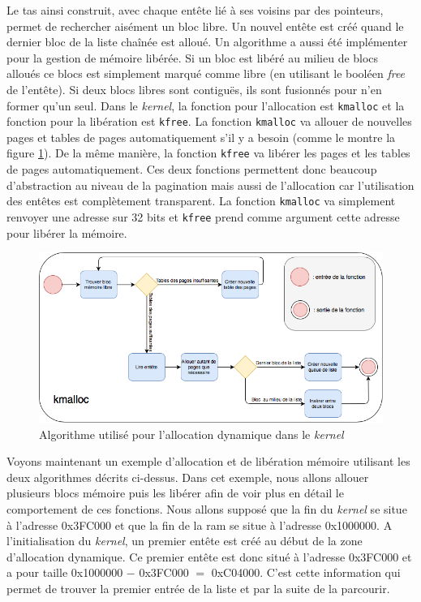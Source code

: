 Le tas ainsi construit, avec chaque entête lié à ses voisins par des pointeurs,
permet de rechercher aisément un bloc libre. Un nouvel entête est créé quand le
dernier bloc de la liste chaînée est alloué. Un algorithme a aussi été implémenter
pour la gestion de mémoire libérée. Si un bloc est libéré au milieu de blocs
alloués ce blocs est simplement marqué comme libre (en utilisant le booléen \textit{free}
de l'entête). Si deux blocs libres sont contiguës, ils sont fusionnés pour n'en
former qu'un seul. Dans le \textit{kernel}, la fonction pour l'allocation est
\texttt{kmalloc} et la fonction pour la libération est \texttt{kfree}.
La fonction \texttt{kmalloc} va allouer de nouvelles pages et tables
de pages automatiquement s'il y a besoin (comme le montre la figure \ref{kmalloc}).
De la même manière, la fonction \texttt{kfree} va libérer les pages et
les tables de pages automatiquement. Ces deux fonctions permettent donc beaucoup
d'abstraction au niveau de la pagination mais aussi de l'allocation car l'utilisation
des entêtes est complètement transparent. La fonction \texttt{kmalloc}
va simplement renvoyer une adresse sur 32 bits et \texttt{kfree} prend
comme argument cette adresse pour libérer la mémoire.

\begin{figure}[!h]
  \centering
  \includegraphics[scale=0.6]{images/kmalloc.png}
  \caption{Algorithme utilisé pour l'allocation dynamique dans le \textit{kernel}}
  \label{kmalloc}
\end{figure}

Voyons maintenant un exemple d'allocation et de libération mémoire utilisant les
deux algorithmes décrits ci-dessus. Dans cet exemple, nous allons allouer plusieurs
blocs mémoire puis les libérer afin de voir plus en détail le comportement
de ces fonctions. Nous allons supposé que la fin du \textit{kernel} se situe
à l'adresse 0x3FC000 et que la fin de la \acrshort{ram} se situe à l'adresse
0x1000000. A l'initialisation du \textit{kernel}, un premier entête est créé au
début de la zone d'allocation dynamique. Ce premier entête est donc situé à
l'adresse 0x3FC000 et a pour taille 0x1000000 $-$ 0x3FC000 $=$ 0xC04000. C'est cette
information qui permet de trouver la premier entrée de la liste et par la suite
de la parcourir.

